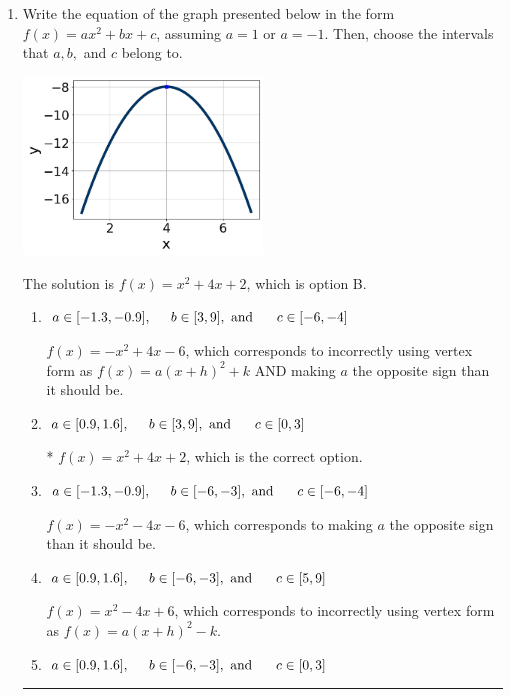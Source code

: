 \documentclass{extbook}[14pt]
\newcommand{\litem}[1]{\item #1

\rule{\textwidth}{0.4pt}}
\begin{document}
\begin{enumerate}\litem{
Write the equation of the graph presented below in the form $f(x)=ax^2+bx+c$, assuming  $a=1$ or $a=-1$. Then, choose the intervals that $a, b,$ and $c$ belong to.

\begin{center}
    \includegraphics[width=0.5\textwidth]{../Figures/quadraticGraphToEquationCopyA.png}
\end{center}


The solution is \( f(x) = x^{2} +4 x + 2 \), which is option B.\begin{enumerate}[label=\Alph*.]
\item \( a \in [-1.3, -0.9], \hspace*{5mm} b \in [3, 9], \text{ and } \hspace*{5mm} c \in [-6, -4] \)

$f(x)=-x^{2} +4 x -6$, which corresponds to incorrectly using vertex form as $f(x) = a(x+h)^2+k$ AND making $a$ the opposite sign than it should be.
\item \( a \in [0.9, 1.6], \hspace*{5mm} b \in [3, 9], \text{ and } \hspace*{5mm} c \in [0, 3] \)

* $f(x)=x^{2} +4 x + 2$, which is the correct option.
\item \( a \in [-1.3, -0.9], \hspace*{5mm} b \in [-6, -3], \text{ and } \hspace*{5mm} c \in [-6, -4] \)

$f(x)=-x^{2} -4 x -6$, which corresponds to making $a$ the opposite sign than it should be.
\item \( a \in [0.9, 1.6], \hspace*{5mm} b \in [-6, -3], \text{ and } \hspace*{5mm} c \in [5, 9] \)

$f(x)=x^{2} -4 x + 6$, which corresponds to incorrectly using vertex form as $f(x) = a(x+h)^2 - k$.
\item \( a \in [0.9, 1.6], \hspace*{5mm} b \in [-6, -3], \text{ and } \hspace*{5mm} c \in [0, 3] \)


\end{enumerate}}
\end{enumerate}
\end{document}
